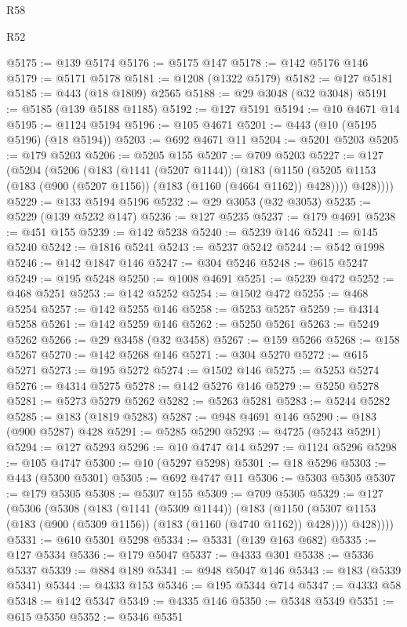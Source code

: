 \begin{lexlean}{R58}
\begin{lexlean}{R52}
\begin{coremodule}
{{{{{{{{{{{{{{{{{{{{{{{{{{{{{{{{{{{{{{{{{{{{{{{{{{{{{{{{{{{{{{{{{{{{{{{{{{{{{{{{{{{{{{{{{{{{{{{{{{{{{{{{{{{{{{{{{{{{{{{{{{{{{{{{{{{{{{{{{{{{{{{{{{{{{{{{{{{{{{{{{{{{{{{{{{{{{{{{{{{{{{{{{{{{{{{{{{{{{{@5175 := @139 @5174
@5176 := @5175 @147
@5178 := @142 @5176 @146
@5179 := @5171 @5178
@5181 := @1208 (@1322 @5179)
@5182 := @127 @5181
@5185 := @443 (@18 @1809) @2565
@5188 := @29 @3048 (@32 @3048)
@5191 := @5185 (@139 @5188 @1185)
@5192 := @127 @5191
@5194 := @10 @4671 @14
@5195 := @1124 @5194
@5196 := @105 @4671
@5201 := @443 (@10 (@5195 @5196) (@18 @5194))
@5203 := @692 @4671 @11
@5204 := @5201 @5203
@5205 := @179 @5203
@5206 := @5205 @155
@5207 := @709 @5203
@5227 := @127
    (@5204
      (@5206
        (@183
          (@1141 (@5207 @1144))
          (@183
            (@1150 (@5205 @1153 (@183 (@900 (@5207 @1156)) (@183 (@1160 (@4664 @1162)) @428))))
            @428))))
@5229 := @133 @5194 @5196
@5232 := @29 @3053 (@32 @3053)
@5235 := @5229 (@139 @5232 @147)
@5236 := @127 @5235
@5237 := @179 @4691
@5238 := @451 @155
@5239 := @142 @5238
@5240 := @5239 @146
@5241 := @145 @5240
@5242 := @1816 @5241
@5243 := @5237 @5242
@5244 := @542 @1998
@5246 := @142 @1847 @146
@5247 := @304 @5246
@5248 := @615 @5247
@5249 := @195 @5248
@5250 := @1008 @4691
@5251 := @5239 @472
@5252 := @468 @5251
@5253 := @142 @5252
@5254 := @1502 @472
@5255 := @468 @5254
@5257 := @142 @5255 @146
@5258 := @5253 @5257
@5259 := @4314 @5258
@5261 := @142 @5259 @146
@5262 := @5250 @5261
@5263 := @5249 @5262
@5266 := @29 @3458 (@32 @3458)
@5267 := @159 @5266
@5268 := @158 @5267
@5270 := @142 @5268 @146
@5271 := @304 @5270
@5272 := @615 @5271
@5273 := @195 @5272
@5274 := @1502 @146
@5275 := @5253 @5274
@5276 := @4314 @5275
@5278 := @142 @5276 @146
@5279 := @5250 @5278
@5281 := @5273 @5279 @5262
@5282 := @5263 @5281
@5283 := @5244 @5282
@5285 := @183 (@1819 @5283)
@5287 := @948 @4691 @146
@5290 := @183 (@900 @5287) @428
@5291 := @5285 @5290
@5293 := @4725 (@5243 @5291)
@5294 := @127 @5293
@5296 := @10 @4747 @14
@5297 := @1124 @5296
@5298 := @105 @4747
@5300 := @10 (@5297 @5298)
@5301 := @18 @5296
@5303 := @443 (@5300 @5301)
@5305 := @692 @4747 @11
@5306 := @5303 @5305
@5307 := @179 @5305
@5308 := @5307 @155
@5309 := @709 @5305
@5329 := @127
    (@5306
      (@5308
        (@183
          (@1141 (@5309 @1144))
          (@183
            (@1150 (@5307 @1153 (@183 (@900 (@5309 @1156)) (@183 (@1160 (@4740 @1162)) @428))))
            @428))))
@5331 := @610 @5301 @5298
@5334 := @5331 (@139 @163 @682)
@5335 := @127 @5334
@5336 := @179 @5047
@5337 := @4333 @301
@5338 := @5336 @5337
@5339 := @884 @189
@5341 := @948 @5047 @146
@5343 := @183 (@5339 @5341)
@5344 := @4333 @153
@5346 := @195 @5344 @714
@5347 := @4333 @58
@5348 := @142 @5347
@5349 := @4335 @146
@5350 := @5348 @5349
@5351 := @615 @5350
@5352 := @5346 @5351
}}}}}}}}}}}}}}}}}}}}}}}}}}}}}}}}}}}}}}}}}}}}}}}}}}}}}}}}}}}}}}}}}}}}}}}}}}}}}}}}}}}}}}}}}}}}}}}}}}}}}}}}}}}}}}}}}}}}}}}}}}}}}}}}}}}}}}}}}}}}}}}}}}}}}}}}}}}}}}}}}}}}}}}}}}}}}}}}}}}}}}}}}}}}}}}}}}}}}}
\end{coremodule}
\end{lexlean}
\end{lexlean}

